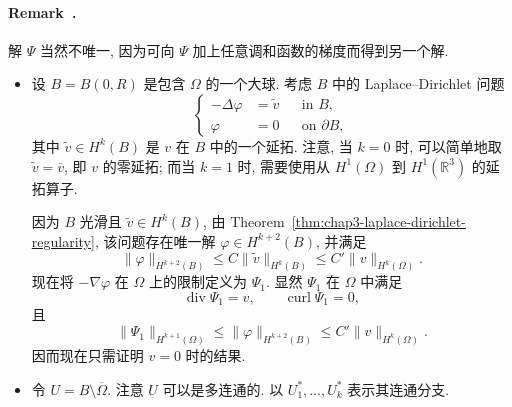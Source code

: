 \paragraph{Remark~\thechapterfoursectionfourremark.}\label{rem:chap4-vector-potential-nonuniqueness}
解 $\Psi$ 当然不唯一, 因为可向 $\Psi$ 加上任意调和函数的梯度而得到另一个解.

\begin{Proof}
\begin{itemize}
 \item 设 $B=B(0,R)$ 是包含 $\Omega$ 的一个大球. 考虑 $B$ 中的 Laplace--Dirichlet 问题
 \[
 \left\{
 \begin{aligned}
 -\Delta\varphi&=\widetilde v&&\text{in }B,\\
 \varphi&=0&&\text{on }\partial B,
 \end{aligned}
 \right.
 \]
 其中 $\widetilde v\in H^k(B)$ 是 $v$ 在 $B$ 中的一个延拓. 注意, 当 $k=0$ 时,
 可以简单地取 $\widetilde v=\overline v$, 即 $v$ 的零延拓; 而当 $k=1$ 时,
 需要使用从 $H^1(\Omega)$ 到 $H^1(\mathbb R^3)$ 的延拓算子.

 因为 $B$ 光滑且 $\widetilde v\in H^k(B)$, 由
 Theorem~\ref{thm:chap3-laplace-dirichlet-regularity},
 该问题存在唯一解 $\varphi\in H^{k+2}(B)$, 并满足
 \[
  \|\varphi\|_{H^{k+2}(B)}\leq C\|\widetilde v\|_{H^k(B)}
  \leq C'\|v\|_{H^k(\Omega)}.
 \]
 现在将 $-\nabla\varphi$ 在 $\Omega$ 上的限制定义为 $\Psi_1$. 显然 $\Psi_1$ 在 $\Omega$ 中满足
 \[
 \operatorname{div}\Psi_1=v,\qquad\operatorname{curl}\Psi_1=0,
 \]
 且
 \[
  \|\Psi_1\|_{H^{k+1}(\Omega)}
  \leq\|\varphi\|_{H^{k+2}(B)}\leq C'\|v\|_{H^k(\Omega)}.
 \]
 因而现在只需证明 $v=0$ 时的结果.

 \item 令 $U=B\setminus\overline\Omega$. 注意 $U$ 可以是多连通的. 以
 $U_1^*,\ldots,U_k^*$ 表示其连通分支.


\end{itemize}
\end{Proof}
